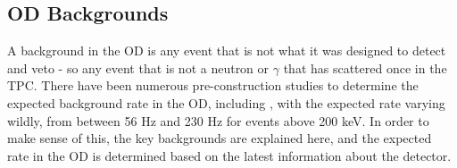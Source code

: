 \subsection{OD Backgrounds}
\label{sec:simulated_od_backgrounds}
\par
A background in the OD is any event that is not what it was designed to detect and veto - so any event that is not a neutron or $\gamma$ that has scattered once in the TPC.
There have been numerous pre-construction studies to determine the expected background rate in the OD, including \cite{LZ_TechnicalDesignReview_ref,LZ_projected_sensitivity_paper_ref,sallyshaw_thesis_ref,scotthaselschwardt_thesis_ref,lz_od_taup_2019_ref}, with the expected rate varying wildly, from between 56 Hz and 230 Hz for events above 200 keV.
In order to make sense of this, the key backgrounds are explained here, and the expected rate in the OD is determined based on the latest information about the detector.


